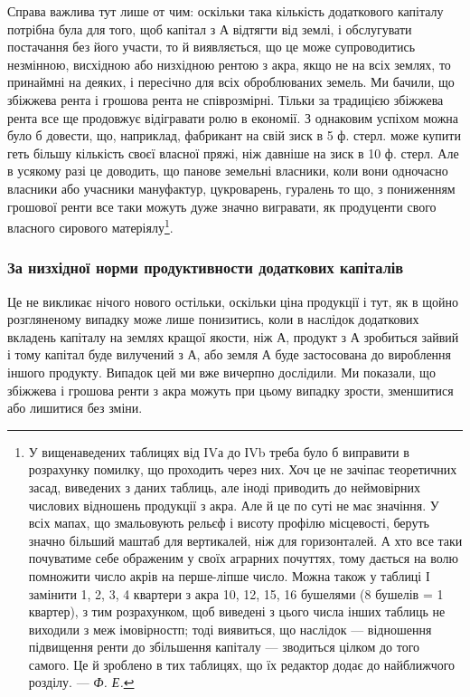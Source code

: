Справа важлива тут лише от чим: оскільки така кількість додаткового
капіталу потрібна була для того, щоб капітал з $А$ відтягти від землі, і обслугувати
постачання без його участи, то й виявляється, що це може супроводитись
незмінною, висхідною або низхідною рентою з акра, якщо не на всіх землях, то
принаймні на деяких, і пересічно для всіх оброблюваних земель. Ми бачили, що
збіжжева рента і грошова рента не співрозмірні. Тільки за традицією збіжжева
рента все ще продовжує відігравати ролю в економії. З однаковим успіхом можна
було б довести, що, наприклад, фабрикант на свій зиск в 5 ф. стерл. може купити
геть більшу кількість своєї власної пряжі, ніж давніше на зиск в 10 ф. стерл.
Але в усякому разі це доводить, що панове земельні власники, коли вони одночасно
власники або учасники мануфактур, цукроварень, гуралень то що, з пониженням
грошової ренти все таки можуть дуже значно вигравати, як продуценти
свого власного сирового матеріялу\footnote{
У вищенаведених таблицях від IVа до ІVb треба було б виправити в розрахунку помилку, що
проходить через них. Хоч це не зачіпає теоретичних засад, виведених з даних таблиць, але іноді
приводить до неймовірних числових відношень продукції з акра. Але й це по суті не має значіння. У
всіх мапах, що змальовують рельєф і висоту профілю місцевості, беруть значно більший маштаб для
вертикалей, ніж для горизонталей. А хто все таки почуватиме себе ображеним у своїх аграрних
почуттях, тому дається на волю помножити число акрів на перше-ліпше число. Можна також у таблиці І
замінити 1, 2, 3, 4 квартери з акра 10, 12, 15, 16 бушелями (8 бушелів = 1 квартер), з тим
розрахунком, щоб виведені з цього числа інших таблиць не виходили з меж імовірностп; тоді виявиться,
що наслідок — відношення підвищення ренти до збільшення капіталу — зводиться цілком до того самого.
Це й зроблено в тих таблицях, що їх редактор додає до найближчого розділу. —\emph{ Ф. Е.}
}.

\subsubsection{За низхідної норми продуктивности додаткових капіталів}

Це не викликає нічого нового остільки, оскільки ціна продукції і тут, як
в щойно розгляненому випадку може лише понизитись, коли в наслідок додаткових
вкладень капіталу на землях кращої якости, ніж $А$, продукт з $А$ зробиться
зайвий і тому капітал буде вилучений з $А$, або земля $А$ буде застосована до вироблення
іншого продукту. Випадок цей ми вже вичерпно дослідили. Ми показали,
що збіжжева і грошова ренти з акра можуть при цьому випадку зрости,
зменшитися або лишитися без зміни.

